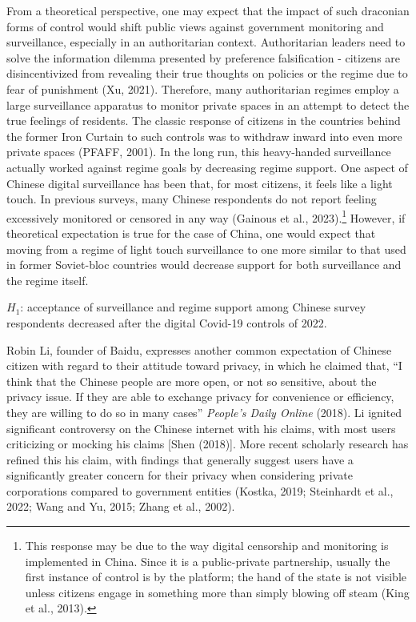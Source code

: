 \documentclass[
  letterpaper,
  DIV=11,
  numbers=noendperiod]{scrartcl}
\begin{document}
From a theoretical perspective, one may expect that the impact of such
draconian forms of control would shift public views against government
monitoring and surveillance, especially in an authoritarian context.
Authoritarian leaders need to solve the information dilemma presented by
preference falsification - citizens are disincentivized from revealing
their true thoughts on policies or the regime due to fear of punishment
(Xu, 2021). Therefore, many authoritarian regimes employ a large
surveillance apparatus to monitor private spaces in an attempt to detect
the true feelings of residents. The classic response of citizens in the
countries behind the former Iron Curtain to such controls was to
withdraw inward into even more private spaces (PFAFF, 2001). In the long
run, this heavy-handed surveillance actually worked against regime goals
by decreasing regime support. One aspect of Chinese digital surveillance
has been that, for most citizens, it feels like a light touch. In
previous surveys, many Chinese respondents do not report feeling
excessively monitored or censored in any way (Gainous et al.,
2023).\footnote{This response may be due to the way digital censorship
  and monitoring is implemented in China. Since it is a public-private
  partnership, usually the first instance of control is by the platform;
  the hand of the state is not visible unless citizens engage in
  something more than simply blowing off steam (King et al., 2013).}
However, if theoretical expectation is true for the case of China, one
would expect that moving from a regime of light touch surveillance to
one more similar to that used in former Soviet-bloc countries would
decrease support for both surveillance and the regime itself.

\(H_1\): acceptance of surveillance and regime support among Chinese
survey respondents decreased after the digital Covid-19 controls of
2022.

Robin Li, founder of Baidu, expresses another common expectation of
Chinese citizen with regard to their attitude toward privacy, in which
he claimed that, ``I think that the Chinese people are more open, or not
so sensitive, about the privacy issue. If they are able to exchange
privacy for convenience or efficiency, they are willing to do so in many
cases'' \emph{People's Daily Online} (2018). Li ignited significant
controversy on the Chinese internet with his claims, with most users
criticizing or mocking his claims {[}Shen (2018){]}. More recent
scholarly research has refined this his claim, with findings that
generally suggest users have a significantly greater concern for their
privacy when considering private corporations compared to government
entities (Kostka, 2019; Steinhardt et al., 2022; Wang and Yu, 2015;
Zhang et al., 2002).
\end{document}
